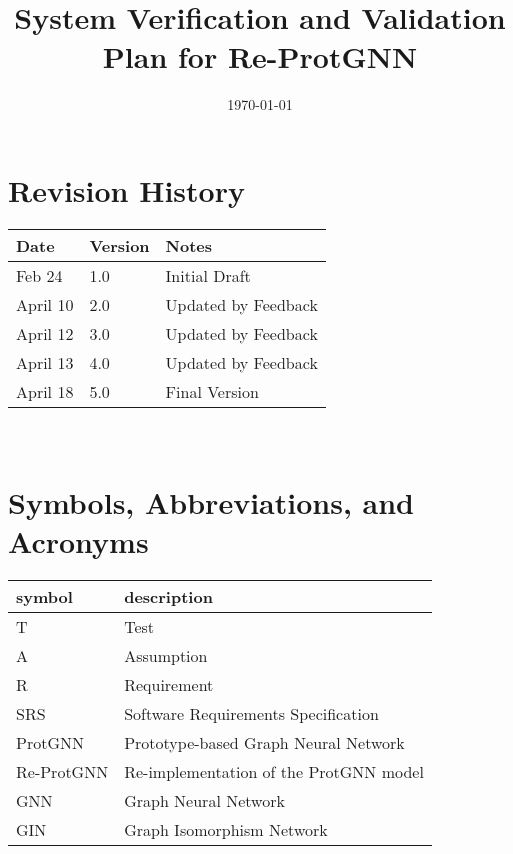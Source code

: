 \documentclass[12pt, titlepage]{article}
\begin{document}
\title{System Verification and Validation Plan for Re-ProtGNN} 
\author{\authname}
\date{\today}
	
\maketitle


\section*{Revision History}

\begin{tabularx}{\textwidth}{p{3cm}p{2cm}X}
\toprule {\bf Date} & {\bf Version} & {\bf Notes}\\
\midrule
Feb 24 & 1.0 & Initial Draft\\
April 10 & 2.0 & Updated by Feedback\\
April 12 & 3.0 & Updated by Feedback\\
April 13 & 4.0 & Updated by Feedback\\
April 18 & 5.0 & Final Version\\
\bottomrule
\end{tabularx}

~\\


\newpage

\tableofcontents

\listoftables


\newpage

\section{Symbols, Abbreviations, and Acronyms}

\renewcommand{\arraystretch}{1.2}
\begin{tabular}{l l} 
  \toprule		
  \textbf{symbol} & \textbf{description}\\
  \midrule 
  T & Test\\
  A & Assumption\\
  R & Requirement\\
  SRS & Software Requirements Specification\\
  ProtGNN & Prototype-based Graph Neural Network\\
  Re-ProtGNN & Re-implementation of the ProtGNN model\\
  GNN & Graph Neural Network\\
  GIN & Graph Isomorphism Network\\
  \bottomrule
\end{tabular}\\
\end{document}
